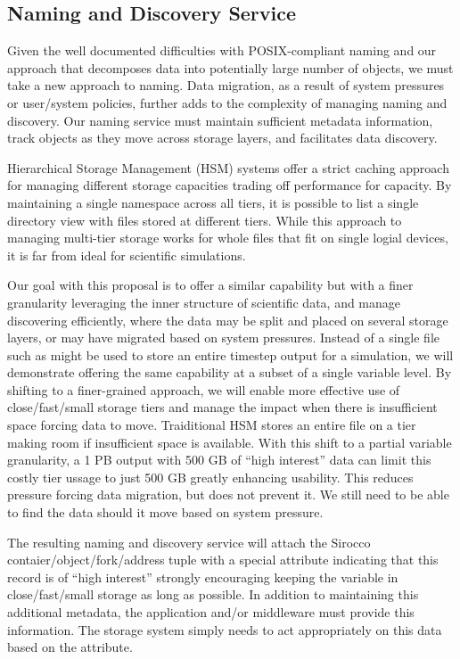 \subsection{Naming and Discovery Service}

Given the well documented difficulties with POSIX-compliant naming and our
approach that decomposes data into potentially large number of objects, 
we must take a new approach to naming.
Data migration, as a result of system pressures or user/system policies,
further adds to the complexity of managing naming and discovery. Our naming
service must maintain sufficient metadata information, track objects
as they move across storage layers, and facilitates data discovery.

Hierarchical Storage Management (HSM) systems \cite{hsm} offer a strict caching approach
for managing different storage capacities trading off performance for capacity.
By maintaining a single namespace across all tiers, it is possible to list a
single directory view with files stored at different tiers. While this approach
to managing multi-tier storage works for whole files that fit on single logial
devices, it is far from ideal for scientific simulations.

Our goal with this proposal is to offer a similar capability but with a finer
granularity leveraging the inner structure of scientific data, 
and manage discovering efficiently, where the data may
be split and placed on several storage layers, or may have migrated
based on system pressures. Instead of a single file such as might be used to
store an entire timestep output for a simulation, we will demonstrate offering
the same capability at a subset of a single variable level. By shifting to a
finer-grained approach, we will enable more effective use of close/fast/small
storage tiers and manage the impact when there is insufficient space forcing
data to move. Traiditional HSM stores an entire file on a tier making room if
insufficient space is available. With this shift to a partial variable
granularity, a 1 PB output with 500 GB of ``high interest'' data can limit this
costly tier ussage to just 500 GB greatly enhancing usability. This reduces
pressure forcing data migration, but does not prevent it. We still need to be
able to find the data should it move based on system pressure.

The resulting naming and discovery service will attach the Sirocco
contaier/object/fork/address tuple with a special attribute indicating that
this record is of ``high interest'' strongly encouraging keeping the variable
in close/fast/small storage as long as possible. In addition to maintaining
this additional metadata, the application and/or middleware must provide this
information. The storage system simply needs to act appropriately on this data
based on the attribute.

